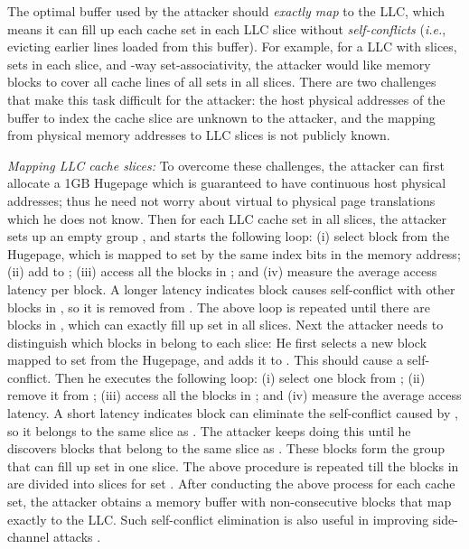 \documentclass{sig-alternate}
\newcommand{\gbytes}{\ensuremath{\mathrm{GB}}\xspace}
\newcommand{\ie}{\emph{i.e.}\xspace}
\begin{document}
The optimal buffer used by the attacker should {\em exactly map} to the LLC, which 
means it can fill up each cache set in each LLC slice without {\em self-conflicts} 
(\ie, evicting earlier lines loaded from this buffer). 
For example, for a LLC with  slices,  sets in each slice, and -way 
set-associativity, the attacker would like  memory blocks to 
cover all cache lines of all sets in all slices. 
There are two challenges that make this 
task difficult for the attacker: the host physical addresses of the buffer to 
index the cache slice are unknown to the attacker, and the mapping from physical 
memory addresses to LLC slices is not publicly known. 

{\em Mapping LLC cache slices:} 
To overcome these challenges, the attacker can first allocate a 1\gbytes Hugepage which is guaranteed to have continuous host physical addresses; thus he need not worry about virtual to physical page translations which he does not know. Then for each LLC cache set  in all slices, the attacker sets up an empty group , and starts the following loop: (i) select block  from the Hugepage, which is mapped to set  by the same index bits in the memory address; (ii) add  to ; (iii) access all the blocks in ; and (iv) measure the average access latency per block. A longer latency indicates block  causes self-conflict with other blocks in , so it is removed from . The above loop is repeated until there are  blocks in , which can exactly fill up set  in all slices. Next the attacker needs to distinguish which blocks in  belong to each slice: He first selects a new block  mapped to set  from the Hugepage, and adds it to . This should cause a self-conflict. Then he executes the following loop: (i) select one block  from ; (ii) remove it from ; (iii) access all the blocks in ; and (iv) measure the average access latency. A short latency indicates block  can eliminate the self-conflict caused by , so it belongs to the same slice as . The attacker keeps doing this until he discovers  blocks that belong to the same slice as . These blocks form the group that can fill up set  in one slice. The above procedure is repeated till the blocks in  are divided into  slices for set . After conducting the above process for each cache set, the attacker obtains a memory buffer with non-consecutive blocks that map exactly to the LLC. Such self-conflict elimination is also useful in improving side-channel attacks \cite{YaLiGe:15}. 
\end{document}
